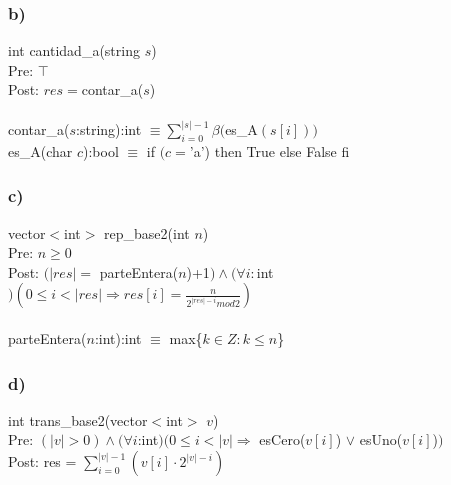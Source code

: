 \documentclass[12 pt]{article}
\begin{document}
    \subsubsection*{b)}
        int cantidad\_a(string $s$)\\
        Pre: $\top$\\
        Post: $res =$contar\_a($s$)\\
        \\
        contar\_a($s$:string):int $\equiv \sum^{|s|-1}_{i=0}\beta($es\_A$(s[i]))$\\
        es\_A(char $c$):bool $\equiv$ if $(c =$'a') then True else False fi
    \subsubsection*{c)}
        vector$<$int$>$ rep\_base2(int $n$)\\
        Pre: $n \geq 0$\\
        Post: $(|res| =$ parteEntera($n$)+1$) \wedge (\forall i:$int$)(0 \leq i < |res| \Rightarrow res[i] =\frac{n}{2^{|res|-i}mod2})$\\
        \\
        parteEntera($n$:int):int $\equiv$ max\{$k \in Z:k \leq n$\}
    \subsubsection*{d)}
        int trans\_base2(vector$<$int$>$ $v$)\\
        Pre: $(|v| > 0) \wedge (\forall i$:int$)(0 \leq i < |v| \Rightarrow$ esCero($v[i]$) $\vee$ esUno($v[i]$)$)$\\
        Post: res = $\sum^{|v|-1}_{i=0}(v[i]\cdot2^{|v|-i})$
\end{document}
